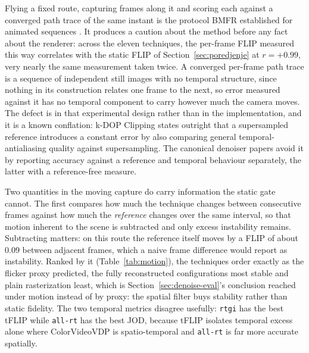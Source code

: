Flying a fixed route, capturing frames along it and scoring each against a converged path trace of
the same instant is the protocol BMFR established for animated sequences
\cite{koskela2019bmfr}. It produces a caution about the method before any fact about the renderer: across the
eleven techniques, the per-frame FLIP measured this way correlates with the static FLIP of
Section~\ref{sec:poredjenje} at $r = +0.99$, very nearly the same measurement taken twice. A
converged per-frame path trace is a sequence of independent still images with no temporal structure,
since nothing in its construction relates one frame to the next, so error measured against it has no
temporal component to carry however much the camera moves. The defect is in that experimental design
rather than in the implementation, and it is a known conflation: k-DOP Clipping
\cite{ikkala2024kdop} states outright that a supersampled reference introduces a constant error by
also comparing general temporal-antialiasing quality against supersampling. The canonical denoiser
papers avoid it by reporting accuracy against a reference and temporal behaviour separately, the
latter with a reference-free measure.

Two quantities in the moving capture do carry information the static gate cannot. The first compares
how much the technique changes between consecutive frames against how much the \emph{reference}
changes over the same interval, so that motion inherent to the scene is subtracted and only excess
instability remains. Subtracting matters: on this route the reference itself moves by a FLIP of about
0.09 between adjacent frames, which a naive frame difference would report as instability. Ranked by
it (Table~\ref{tab:motion}), the techniques order exactly as the flicker proxy predicted, the fully
reconstructed configurations most stable and plain rasterization least, which is
Section~\ref{sec:denoise-eval}'s conclusion reached under motion instead of by proxy: the spatial
filter buys stability rather than static fidelity. The two temporal metrics disagree usefully:
\texttt{rtgi} has the best tFLIP while \texttt{all-rt} has the best JOD, because tFLIP isolates
temporal excess alone where ColorVideoVDP is spatio-temporal and \texttt{all-rt} is far more accurate
spatially.

\begin{table}[tbp]
\caption[Stability under motion per technique]{Stability under motion, averaged over the route's four
probe points (RX 9070 XT), ranked by FLIP. tFLIP measures how much the technique changes between
adjacent frames in excess of how much the reference itself changes, which is TecoGAN's tLP
construction \cite{chu2020tecogan} with FLIP substituted for LPIPS, and lag is the moving frame
against its own converged still frame at the same pose. JOD is ColorVideoVDP
\cite{mantiuk2024cvvdp}, the only measure here that models temporal contrast sensitivity directly.}
\label{tab:motion}
\centering

\end{table}

